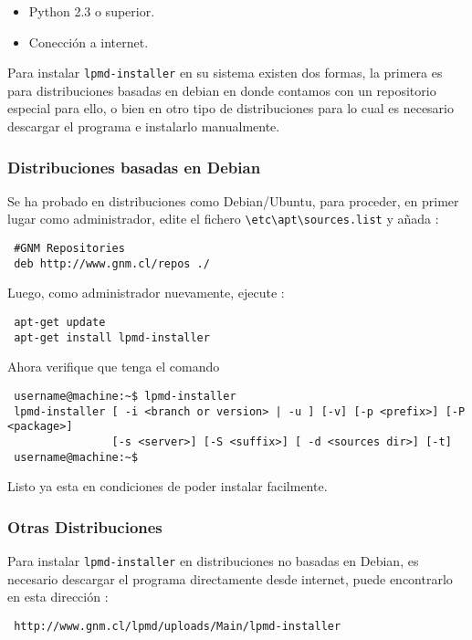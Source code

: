 \begin{itemize}
\item Python 2.3 o superior.
\item Conecci\'on a internet.
\end{itemize}

Para instalar \verb|lpmd-installer| en su sistema existen dos formas, la primera es para distribuciones basadas en debian en donde contamos con un repositorio especial para ello, o bien en otro tipo de distribuciones para lo cual es necesario descargar el programa e instalarlo manualmente.

\subsubsection{Distribuciones basadas en Debian}

Se ha probado en distribuciones como Debian/Ubuntu, para proceder, en primer lugar como administrador, edite el fichero \verb|\etc\apt\sources.list| y a\~nada :

\begin{verbatim}
 #GNM Repositories
 deb http://www.gnm.cl/repos ./
\end{verbatim}

Luego, como administrador nuevamente, ejecute :

\begin{verbatim}
 apt-get update
 apt-get install lpmd-installer
\end{verbatim}

Ahora verifique que tenga el comando
\begin{verbatim}
 username@machine:~$ lpmd-installer 
 lpmd-installer [ -i <branch or version> | -u ] [-v] [-p <prefix>] [-P <package>] 
                [-s <server>] [-S <suffix>] [ -d <sources dir>] [-t]
 username@machine:~$
\end{verbatim}

Listo ya esta en condiciones de poder instalar {\lpmd} facilmente.

\subsubsection{Otras Distribuciones}

Para instalar \verb|lpmd-installer| en distribuciones no basadas en Debian, es necesario descargar el programa directamente desde internet, puede encontrarlo en esta direcci\'on :

\begin{verbatim}
 http://www.gnm.cl/lpmd/uploads/Main/lpmd-installer
\end{verbatim}

